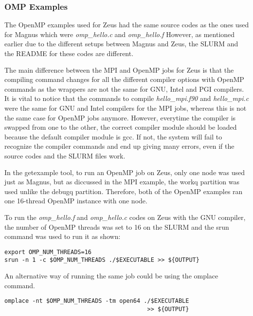 \subsubsection{OMP Examples}

The OpenMP examples used for Zeus had the same source codes as the ones used for Magnus which were \emph{omp\_hello.c} and \emph{omp\_hello.f}
However, as mentioned earlier due to the different setups between Magnus and Zeus, the SLURM and the README for these codes are different.

The main difference between the MPI and OpenMP jobs for Zeus is that the compiling command changes for all the different compiler options with OpenMP
commands as the wrappers are not the same for GNU, Intel and PGI compilers. It is vital to notice that the commands to compile \emph{hello\_mpi.f90} and
\emph{hello\_mpi.c} were the same for GNU and Intel compilers for the MPI jobs, whereas this is not the same case for OpenMP jobs anymore. However, 
everytime the compiler is swapped from one to the other, the correct compiler module should be loaded because the default compiler module is gcc. If not, 
the system will fail to recognize the compiler commands and end up giving many errors, even if the source codes and the SLURM files work.

In the getexample tool, to run an OpenMP job on Zeus, only one node was used just as Magnus, but as diccussed in the MPI example, the workq partition was
used unlike the debugq partition. Therefore, both of the OpenMP examples ran one 16-thread OpenMP instance with one node.

To run the \emph{omp\_hello.f} and \emph{omp\_hello.c} codes on Zeus with the GNU compiler, the number of OpenMP threads was set to 16 on the SLURM and 
the srun command was used to run it as shown:

\begin{tcolorbox}
\begin{Verbatim}[fontsize=\scriptsize]
export OMP_NUM_THREADS=16
srun -n 1 -c $OMP_NUM_THREADS ./$EXECUTABLE >> ${OUTPUT}
\end{Verbatim}
\end{tcolorbox}

An alternative way of running the same job could be using the omplace command.

\begin{tcolorbox}
\begin{Verbatim}[fontsize=\scriptsize]
omplace -nt $OMP_NUM_THREADS -tm open64 ./$EXECUTABLE 
                                         >> ${OUTPUT}
\end{Verbatim}
\end{tcolorbox}

